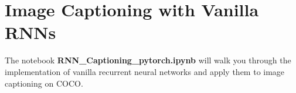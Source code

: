 \section{Image Captioning with Vanilla RNNs}

 The notebook \textbf{RNN\_Captioning\_pytorch.ipynb} will walk you through the implementation of vanilla recurrent neural networks and apply them to image captioning on COCO.
